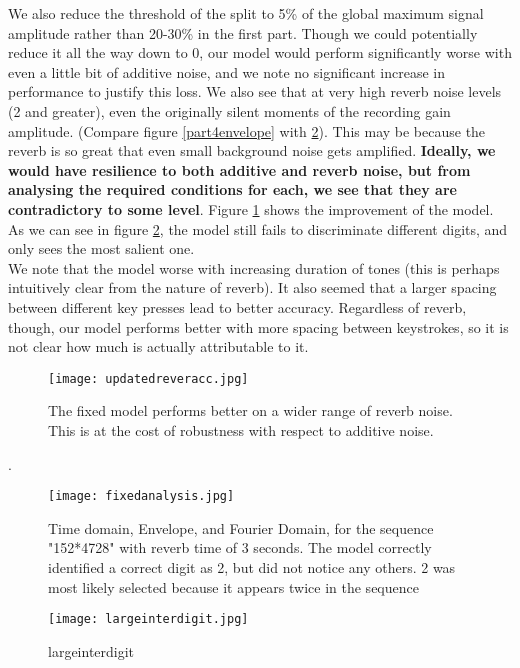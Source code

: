 \documentclass{article}
\begin{document}
We also reduce the threshold of the split to 5\% of the global maximum signal amplitude rather than 20-30\% in the first part. Though we could potentially reduce it all the way down to 0, our model would perform significantly worse with even a little bit of additive noise, and we note no significant increase in performance to justify this loss.
We also see that at very high reverb noise levels (2 and greater), even the originally silent moments of the recording gain amplitude. (Compare figure \ref{part4envelope} with \ref{fixedanalysis}). This may be because the reverb is so great that even small background noise gets amplified.
\textbf{Ideally, we would have resilience to both additive and reverb noise, but from analysing the required conditions for each, we see that they are contradictory to some level}. Figure \ref{updatedreveracc} shows the improvement of the model. As we can see in figure \ref{fixedanalysis}, the model still fails to discriminate different digits, and only sees the most salient one.\\

We note that the model worse with increasing duration of tones (this is perhaps intuitively clear from the nature of reverb). It also seemed that a larger spacing between different key presses lead to better accuracy. Regardless of reverb, though, our model performs better with more spacing between keystrokes, so it is not clear how much is actually attributable to it.
\begin{figure}[h]
	\texttt{[image: updatedreveracc.jpg]}
	\caption{The fixed model performs better on a wider range of reverb noise. This is at the cost of robustness with respect to additive noise.}	
	\label{updatedreveracc}
\end{figure}
.\\
\begin{figure}[h]
	\texttt{[image: fixedanalysis.jpg]}
	\caption{Time domain, Envelope, and Fourier Domain, for the sequence "152*4728" with reverb time of 3 seconds. The model correctly identified a correct digit as 2, but did not notice any others. 2 was most likely selected because it appears twice in the sequence}	
	\label{fixedanalysis}
\end{figure}
\begin{figure}[h]
	\texttt{[image: largeinterdigit.jpg]}
	\caption{largeinterdigit}
	\label{Example with larger distance between key presses. Compared to previous trials, it is easier to discriminate digits, leading to an increase in accuracy}
\end{figure}
\end{document}
